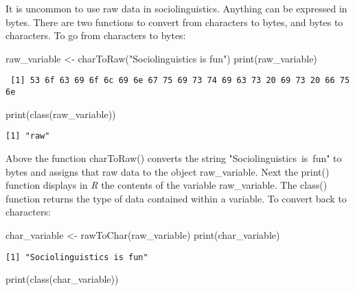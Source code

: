 \documentclass[
  10pt,
  letterpaper]{article}
\newenvironment{Shaded}{\begin{snugshade}}{\end{snugshade}}
\newcommand{\FunctionTok}[1]{\textcolor[rgb]{0.28,0.35,0.67}{#1}}
\newcommand{\NormalTok}[1]{\textcolor[rgb]{0.00,0.23,0.31}{#1}}
\newcommand{\OtherTok}[1]{\textcolor[rgb]{0.00,0.23,0.31}{#1}}
\newcommand{\StringTok}[1]{\textcolor[rgb]{0.13,0.47,0.30}{#1}}
\renewcommand\texttt[1]{{\ttfamily\color{BrickRed}#1}}
\begin{document}
It is uncommon to use \texttt{raw} data in sociolinguistics. Anything
can be expressed in bytes. There are two functions to convert from
characters to bytes, and bytes to characters. To go from characters to
bytes:

\begin{Shaded}
\begin{Highlighting}[]
\NormalTok{raw\_variable }\OtherTok{\textless{}{-}} \FunctionTok{charToRaw}\NormalTok{(}\StringTok{"Sociolinguistics is fun"}\NormalTok{)}
\FunctionTok{print}\NormalTok{(raw\_variable)}
\end{Highlighting}
\end{Shaded}

\begin{verbatim}
 [1] 53 6f 63 69 6f 6c 69 6e 67 75 69 73 74 69 63 73 20 69 73 20 66 75 6e
\end{verbatim}

\begin{Shaded}
\begin{Highlighting}[]
\FunctionTok{print}\NormalTok{(}\FunctionTok{class}\NormalTok{(raw\_variable))}
\end{Highlighting}
\end{Shaded}

\begin{verbatim}
[1] "raw"
\end{verbatim}

Above the function \texttt{charToRaw()} converts the string
\texttt{"Sociolinguistics\ is\ fun"} to bytes and assigns that raw data
to the object \texttt{raw\_variable}. Next the \texttt{print()} function
displays in \emph{R} the contents of the variable
\texttt{raw\_variable}. The \texttt{class()} function returns the type
of data contained within a variable. To convert back to characters:

\begin{Shaded}
\begin{Highlighting}[]
\NormalTok{char\_variable }\OtherTok{\textless{}{-}} \FunctionTok{rawToChar}\NormalTok{(raw\_variable)}
\FunctionTok{print}\NormalTok{(char\_variable)}
\end{Highlighting}
\end{Shaded}

\begin{verbatim}
[1] "Sociolinguistics is fun"
\end{verbatim}

\begin{Shaded}
\begin{Highlighting}[]
\FunctionTok{print}\NormalTok{(}\FunctionTok{class}\NormalTok{(char\_variable))}
\end{Highlighting}
\end{Shaded}
\end{document}
